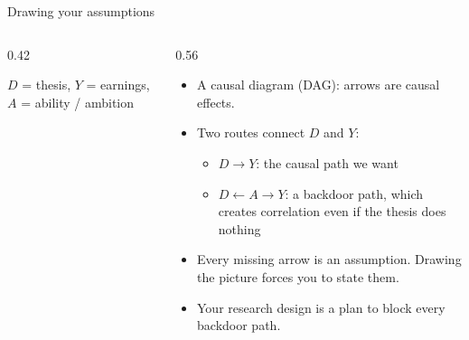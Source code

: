 \documentclass[aspectratio=169,11pt]{beamer}
\begin{document}
\begin{frame}{Drawing your assumptions}
\begin{columns}
\begin{column}{0.42\textwidth}
\begin{center}
\end{center}
\smallskip
{\small $D$ = thesis, $Y$ = earnings, $A$ = ability / ambition}
\end{column}
\begin{column}{0.56\textwidth}
\begin{itemize}
	\item A \alert{causal diagram} (DAG): arrows are causal effects.
	\item Two routes connect $D$ and $Y$:
	\begin{itemize}
		\item $D \rightarrow Y$: the \alert{causal path} we want
		\item $D \leftarrow A \rightarrow Y$: a \alert{backdoor path}, which creates correlation even if the thesis does nothing
	\end{itemize}
	\item Every \alert{missing} arrow is an assumption. Drawing the picture forces you to state them.
	\item Your research design is a plan to \alert{block every backdoor path}.
\end{itemize}
\end{column}
\end{columns}
\end{frame}
\end{document}
